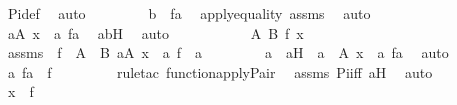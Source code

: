 \begin{isabellebody}
\ Pi{\isacharunderscore}{\kern0pt}def\ \isamarkupfalse%
\ auto\ \isanewline
\ \ \ \ \isamarkupfalse%
\ \isamarkupfalse%
\ {\isachardoublequoteopen}b\ {\isacharequal}{\kern0pt}\ f{\isacharbackquote}{\kern0pt}a{\isachardoublequoteclose}\ \isamarkupfalse%
\ apply{\isacharunderscore}{\kern0pt}equality\ assms\ \isamarkupfalse%
\ auto\ \isanewline
\ \ \ \ \isamarkupfalse%
\ \isamarkupfalse%
\ {\isachardoublequoteopen}{\isasymexists}a{\isasymin}A{\isachardot}{\kern0pt}\ x\ {\isacharequal}{\kern0pt}\ {\isacharless}{\kern0pt}a{\isacharcomma}{\kern0pt}\ f{\isacharbackquote}{\kern0pt}a{\isachargreater}{\kern0pt}{\isachardoublequoteclose}\ \isamarkupfalse%
\ abH\ \isamarkupfalse%
\ auto\ \isanewline
\ \ \isamarkupfalse%
\ \isanewline
\ \ \ \ \isamarkupfalse%
\ A\ B\ f\ x\ \isamarkupfalse%
\ assms\ {\isacharcolon}{\kern0pt}\ {\isachardoublequoteopen}f\ {\isasymin}\ A\ {\isasymrightarrow}\ B{\isachardoublequoteclose}\ {\isachardoublequoteopen}{\isasymexists}a{\isasymin}A{\isachardot}{\kern0pt}\ x\ {\isacharequal}{\kern0pt}\ {\isasymlangle}a{\isacharcomma}{\kern0pt}\ f\ {\isacharbackquote}{\kern0pt}\ a{\isasymrangle}{\isachardoublequoteclose}\ \isanewline
\ \ \ \ \isamarkupfalse%
\ \isamarkupfalse%
\ a\ \ aH\ {\isacharcolon}{\kern0pt}\ {\isachardoublequoteopen}a\ {\isasymin}\ A{\isachardoublequoteclose}\ {\isachardoublequoteopen}x\ {\isacharequal}{\kern0pt}\ {\isacharless}{\kern0pt}a{\isacharcomma}{\kern0pt}\ f{\isacharbackquote}{\kern0pt}a{\isachargreater}{\kern0pt}{\isachardoublequoteclose}\ \isamarkupfalse%
\ auto\ \isanewline
\ \ \ \ \isamarkupfalse%
\ \isamarkupfalse%
\ {\isachardoublequoteopen}{\isacharless}{\kern0pt}a{\isacharcomma}{\kern0pt}\ f{\isacharbackquote}{\kern0pt}a{\isachargreater}{\kern0pt}\ {\isasymin}\ f{\isachardoublequoteclose}\ \isanewline
\ \ \ \ \ \ \isamarkupfalse%
\ {\isacharparenleft}{\kern0pt}rule{\isacharunderscore}{\kern0pt}tac\ function{\isacharunderscore}{\kern0pt}apply{\isacharunderscore}{\kern0pt}Pair{\isacharparenright}{\kern0pt}\ \isamarkupfalse%
\ assms\ Pi{\isacharunderscore}{\kern0pt}iff\ aH\ \isamarkupfalse%
\ auto\ \isanewline
\ \ \ \ \isamarkupfalse%
\ \isamarkupfalse%
\ {\isachardoublequoteopen}x\ {\isasymin}\ f{\isachardoublequoteclose}\ \isamarkupfalse%

\end{isabellebody}
